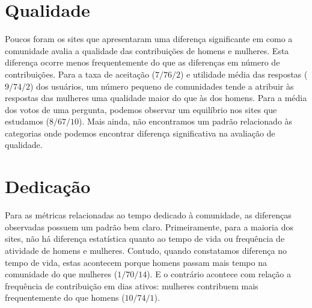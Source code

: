 \section{Qualidade} %
\label{subsec:qualidade}

Poucos foram os sites que apresentaram uma diferença significante em como a comunidade avalia a qualidade das contribuições de homens e mulheres. Esta diferença ocorre menos frequentemente do que as diferenças em número de contribuições. Para a taxa de aceitação ($7/76/2$) e utilidade média das respostas ($9/74/2$) dos usuários, um número pequeno de comunidades tende a atribuir às respostas das mulheres uma qualidade maior do que às dos homens. Para a média dos votos de uma pergunta, podemos observar um equilíbrio nos sites que estudamos ($8/67/10$). Mais ainda, não encontramos um padrão relacionado às categorias onde podemos encontrar diferença significativa na avaliação de qualidade.




\section{Dedicação}%

Para as métricas relacionadas ao tempo dedicado à comunidade, as diferenças observadas possuem um padrão bem claro. Primeiramente, para a maioria dos sites, não há diferença estatística quanto ao tempo de vida ou frequência de atividade de homens e mulheres. Contudo, quando constatamos diferença no tempo de vida, estas acontecem porque homens passam mais tempo na comunidade do que mulheres ($1/70/14$). E o contrário acontece com relação a frequência de contribuição em dias ativos: mulheres contribuem mais frequentemente do que homens ($10/74/1$).

